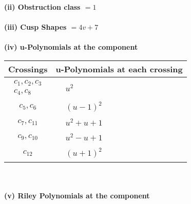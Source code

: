 \documentclass[1p]{elsarticle_modified}
\theoremstyle{definition}
\begin{document}
\flushleft \textbf{(ii) Obstruction class $= 1$}\\~\\
\flushleft \textbf{(iii) Cusp Shapes $= 4 v+7$}\\~\\
\newpage\renewcommand{\arraystretch}{1}
\flushleft \textbf{(iv) u-Polynomials at the component}\newline \\
\begin{tabular}{m{50pt}|m{274pt}}
Crossings & \hspace{64pt}u-Polynomials at each crossing \\
\hline $$\begin{aligned}c_{1},c_{2},c_{3}\\c_{4},c_{8}\end{aligned}$$&$\begin{aligned}
&u^2
\end{aligned}$\\
\hline $$\begin{aligned}c_{5},c_{6}\end{aligned}$$&$\begin{aligned}
&(u-1)^2
\end{aligned}$\\
\hline $$\begin{aligned}c_{7},c_{11}\end{aligned}$$&$\begin{aligned}
&u^2+u+1
\end{aligned}$\\
\hline $$\begin{aligned}c_{9},c_{10}\end{aligned}$$&$\begin{aligned}
&u^2- u+1
\end{aligned}$\\
\hline $$\begin{aligned}c_{12}\end{aligned}$$&$\begin{aligned}
&(u+1)^2
\end{aligned}$\\
\hline
\end{tabular}\\~\\
\newpage\renewcommand{\arraystretch}{1}
\flushleft \textbf{(v) Riley Polynomials at the component}\newline \\
\end{document}
